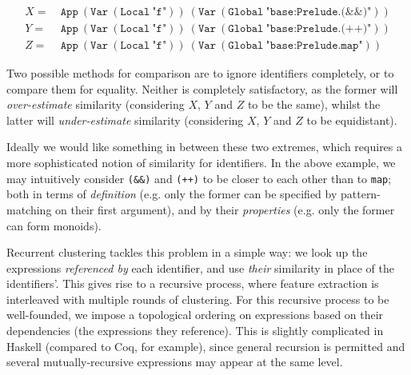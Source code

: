 \begin{equation*}
  \begin{split}
    X =\ & \texttt{App}\ (\texttt{Var}\ (\texttt{Local}\ \texttt{"f"}))\ (\texttt{Var}\ (\texttt{Global}\ \texttt{"base:Prelude.(\&\&)"})) \\
    Y =\ & \texttt{App}\ (\texttt{Var}\ (\texttt{Local}\ \texttt{"f"}))\ (\texttt{Var}\ (\texttt{Global}\ \texttt{"base:Prelude.(++)"})) \\
    Z =\ & \texttt{App}\ (\texttt{Var}\ (\texttt{Local}\ \texttt{"f"}))\ (\texttt{Var}\ (\texttt{Global}\ \texttt{"base:Prelude.map"}))
  \end{split}
\end{equation*}

Two possible methods for comparison are to ignore identifiers completely, or to compare them for equality. Neither is completely satisfactory, as the former will \emph{over-estimate} similarity (considering $X$, $Y$ and $Z$ to be the same), whilst the latter will \emph{under-estimate} similarity (considering $X$, $Y$ and $Z$ to be equidistant).

Ideally we would like something in between these two extremes, which requires a more sophisticated notion of similarity for identifiers. In the above example, we may intuitively consider \texttt{(\&\&)} and \texttt{(++)} to be closer to each other than to \texttt{map}; both in terms of \emph{definition} (e.g. only the former can be specified by pattern-matching on their first argument), and by their \emph{properties} (e.g. only the former can form monoids).

Recurrent clustering tackles this problem in a simple way: we look up the expressions \emph{referenced by} each identifier, and use \emph{their} similarity in place of the identifiers'. This gives rise to a recursive process, where feature extraction is interleaved with multiple rounds of clustering. For this recursive process to be well-founded, we impose a topological ordering on expressions based on their dependencies (the expressions they reference). This is slightly complicated in Haskell (compared to Coq, for example), since general recursion is permitted and several mutually-recursive expressions may appear at the same level.


